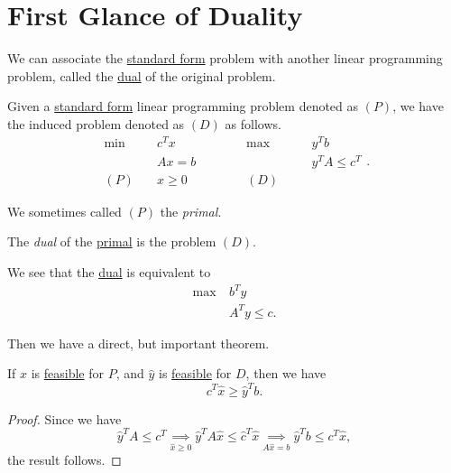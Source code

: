 \section{First Glance of Duality}
We can associate the \hyperref[def:standard-form]{standard form} problem with another linear programming problem, called the \hyperref[def:dual]{dual} of the original problem.
\begin{definition}\label{def:primal-and-dual}
	Given a \hyperref[def:standard-form]{standard form} linear programming problem denoted as \((P)\), we have the induced problem denoted as \((D)\) as follows.
	\[
		\begin{alignedat}{5}
			\min~&c^{T}x\qquad\qquad &&\max ~ &&y^{T}b\\
			&Ax = b && &&y^{T}A\leq c^{T}\\
			(P)\quad&x\geq  0 &&(D)\quad&&
		\end{alignedat}.
	\]
	\begin{definition}[Primal]\label{def:primal}
		We sometimes called \((P)\) the \emph{primal}.
	\end{definition}

	\begin{definition}[Dual]\label{def:dual}
		The \emph{dual} of the \hyperref[def:primal]{primal} is the problem \((D)\).
	\end{definition}
\end{definition}


\begin{note}
	We see that the \hyperref[def:dual]{dual} is equivalent to
	\begin{align*}
		\max~ & b^{T}y         \\
		      & A^{T}y \leq c.
	\end{align*}
\end{note}

Then we have a direct, but important theorem.
\begin{theorem}\label{thm:weak-duality-theorem}
	If \(\hat{x}\) is \hyperref[def:feasible-solution]{feasible} for \(P\), and \(\hat{y}\) is \hyperref[def:feasible-solution]{feasible} for \(D\), then we have
	\[
		c^{T}\hat{x} \geq  \hat{y}^{T} b.
	\]
\end{theorem}
\begin{proof}
	Since we have
	\[
		\hat{y}^{T}A\leq c^{T} \underset{\hat{x}\geq 0}{\implies} \hat{y}^{T}A \hat{x} \leq \hat{c}^{T} \hat{x} \underset{A \hat{x} = b}{\implies} \hat{y}^{T}b \leq c^{T} \hat{x},
	\]
	the result follows.
\end{proof}

